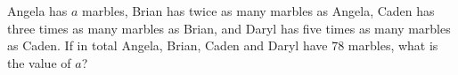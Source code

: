 Angela has $a$ marbles, Brian has twice as many marbles as Angela, Caden has three times as many marbles as Brian, and Daryl has five times as many marbles as Caden. If in total Angela, Brian, Caden and Daryl have $78$ marbles, what is the value of $a$?
